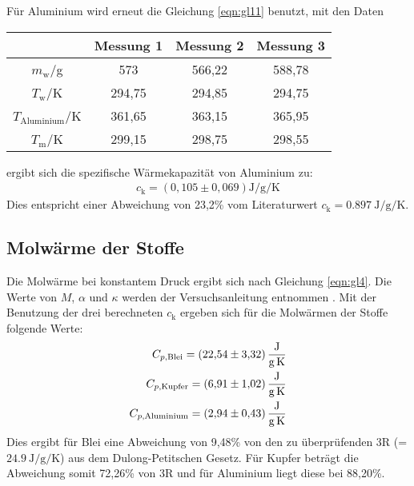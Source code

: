 Für Aluminium wird erneut die Gleichung \eqref{eqn:gl11} benutzt, mit den Daten
\begin{table}
  \centering
  \label{tab:WerteAluminium}
  \begin{tabular}{c c c c}
   \toprule
   & Messung 1 & Messung 2 & Messung 3 \\
   \midrule
   $m_\text{w}$/g & 573 & 566,22 & 588,78 \\
   $T_\text{w}$/K & 294,75 & 294,85 & 294,75 \\
   $T_\text{Aluminium}$/K & 361,65 & 363,15 & 365,95 \\
   $T_\text{m}$/K & 299,15 & 298,75 & 298,55 \\
   \bottomrule
  \end{tabular}
\end{table}
\FloatBarrier
ergibt sich die spezifische Wärmekapazität von Aluminium zu:
\begin{align*}
  c_\text{k} = \left(0,105 \pm 0,069 \right) \si{\joule\per\gram\per\kelvin}
\end{align*}
Dies entspricht einer Abweichung von 23,2\% vom Literaturwert $c_\text{k} = \SI{0,897}{\joule\per\gram\per\kelvin}$.

\subsection{Molwärme der Stoffe}
\label{sec:Molwärme}
Die Molwärme bei konstantem Druck ergibt sich nach Gleichung \eqref{eqn:gl4}.
Die Werte von $M$, $\alpha$ und $\kappa$ werden der Versuchsanleitung entnommen \cite{V201}.
Mit der Benutzung der drei berechneten $c_\text{k}$ ergeben sich für die Molwärmen der Stoffe folgende Werte:
\begin{align*}
  C_{p,\text{Blei}} = \SI{22,54 \pm 3.32}{\joule\per\gram\per\kelvin}\\
  C_{p,\text{Kupfer}} = \SI{6,91 \pm 1,02}{\joule\per\gram\per\kelvin}\\
  C_{p,\text{Aluminium}} = \SI{2,94 \pm 0,43}{\joule\per\gram\per\kelvin}
\end{align*}
Dies ergibt für Blei eine Abweichung von 9,48\% von den zu überprüfenden 3R (= $\SI{24,9}{\joule\per\gram\per\kelvin}$) aus dem Dulong-Petitschen Gesetz.
Für Kupfer beträgt die Abweichung somit 72,26\% von 3R und für Aluminium liegt diese bei 88,20\%.
